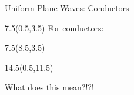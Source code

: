 \begin{lesson36}
\begin{frame}{Uniform Plane Waves: Conductors}
\begin{textblock}{7.5}(0.5,3.5) 
For conductors:
\begin{small}
	
\end{small}
\end{textblock}


\begin{textblock}{7.5}(8.5,3.5)
\begin{small}
\end{small}
\end{textblock}


\begin{textblock}{14.5}(0.5,11.5)
\begin{myblock}[0.95]{}
\begin{center}
\vspace{12pt}
	What does this mean?!?!
\vspace{12pt}
\end{center}
\end{myblock}
\end{textblock}


\end{frame}
\end{lesson36}
